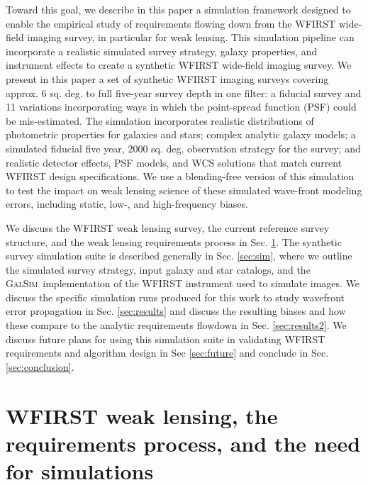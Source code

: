 \documentclass[aps,prd, amsmath,amssymb,superscriptaddress,showkeys,nofootinbib,reprint,preprintnumbers]{revtex4-1}
\newcommand{\galsim}{\textsc{GalSim}}
\begin{document}
Toward this goal, we describe in this paper a simulation framework designed to enable the empirical study of requirements flowing down from the WFIRST wide-field imaging survey, in particular for weak lensing. 
This simulation pipeline can incorporate a realistic simulated survey strategy, galaxy properties, and instrument effects to create a synthetic WFIRST wide-field imaging survey. 
We present in this paper a set of synthetic WFIRST imaging surveys covering approx. 6 sq. deg. to full five-year survey depth in one filter: a fiducial survey and 11 variations incorporating ways in which the point-spread function (PSF) could be mis-estimated. 
The simulation incorporates realistic distributions of photometric properties for galaxies and stars; complex analytic galaxy models; a simulated fiducial five year, 2000 sq. deg. observation strategy for the survey; and realistic detector effects, PSF models, and WCS solutions that match current WFIRST design specifications. 
We use a blending-free version of this simulation to test the impact on weak lensing science of these simulated wave-front modeling errors, including static, low-, and high-frequency biases. 

We discuss the WFIRST weak lensing survey, the current reference survey structure, and the weak lensing requirements process in Sec. \ref{sec:wfirst}. The  synthetic survey simulation suite is described generally in Sec. \ref{sec:sim}, where we outline the simulated survey strategy, input galaxy and star catalogs, and the \galsim\ implementation of the WFIRST instrument used to simulate images. We discuss the specific simulation runs produced for this work to study wavefront error propagation in Sec. \ref{sec:results} and discuss the resulting biases and how these compare to the analytic requirements flowdown in Sec. \ref{sec:results2}. We discuss future plans for using this simulation suite in validating WFIRST requirements and algorithm design in Sec \ref{sec:future} and conclude in Sec. \ref{sec:conclusion}. 

\section{WFIRST weak lensing, the requirements process, and the need for simulations}
\label{sec:wfirst}
\end{document}
